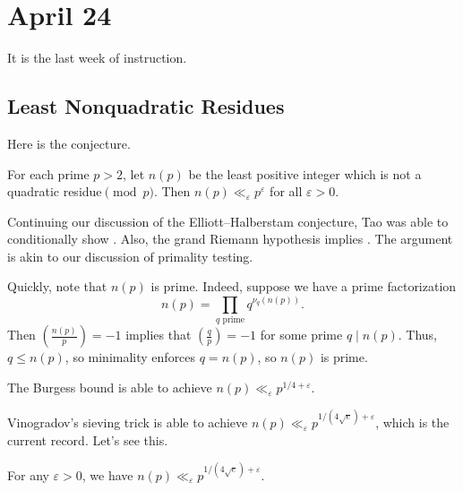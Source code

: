 \documentclass[../notes.tex]{subfiles}
\begin{document}
\section{April 24}

It is the last week of instruction.

\subsection{Least Nonquadratic Residues}
Here is the conjecture.
\begin{conj}[Vinogradov] \label{conj:vinogradov}
	For each prime $p>2$, let $n(p)$ be the least positive integer which is not a quadratic residue$\pmod p$. Then $n(p)\ll_\varepsilon p^\varepsilon$ for all $\varepsilon>0$.
\end{conj}
\begin{remark}
	Continuing our discussion of the Elliott--Halberstam conjecture, Tao was able to conditionally show . Also, the grand Riemann hypothesis implies . The argument is akin to our discussion of primality testing.
\end{remark}
\begin{remark}
	Quickly, note that $n(p)$ is prime. Indeed, suppose we have a prime factorization
	\[n(p)=\prod_{q\text{ prime}}q^{\nu_q(n(p))}.\]
	Then $\left(\frac{n(p)}p\right)=-1$ implies that $\left(\frac qp\right)=-1$ for some prime $q\mid n(p)$. Thus, $q\le n(p)$, so minimality enforces $q=n(p)$, so $n(p)$ is prime.
\end{remark}
\begin{remark}
	The Burgess bound is able to achieve $n(p)\ll_\varepsilon p^{1/4+\varepsilon}$.
\end{remark}
Vinogradov's sieving trick is able to achieve $n(p)\ll_\varepsilon p^{1/(4\sqrt e)+\varepsilon}$, which is the current record. Let's see this.
\begin{theorem}
	For any $\varepsilon>0$, we have $n(p)\ll_\varepsilon p^{1/(4\sqrt e)+\varepsilon}$.
\end{theorem}
\end{document}
